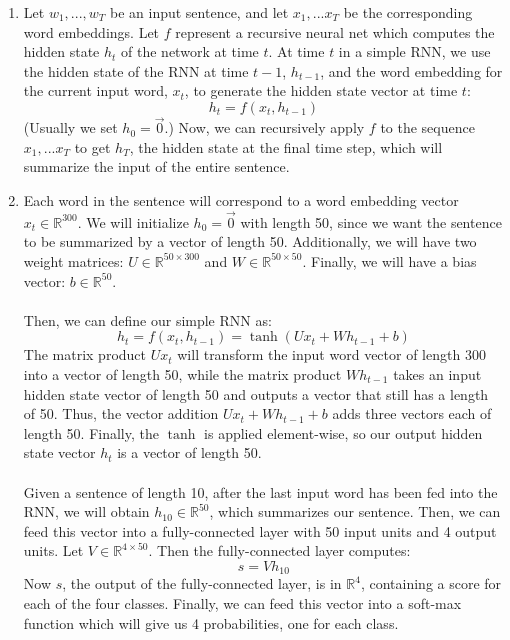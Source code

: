 \documentclass[a4paper]{article}
\begin{document}
\begin{enumerate}

\item{ Let $w_1,...,w_T$ be an input sentence, and let $x_1,...x_T$ be the corresponding word embeddings. Let $f$ represent a recursive neural net which computes the hidden state $h_t$ of the network at time $t$. At time $t$ in a simple RNN, we use the hidden state of the RNN at time $t-1$, $h_{t-1}$, and the word embedding for the current input word, $x_t$, to generate the hidden state vector at time $t$: 
$$h_t = f(x_t, h_{t-1}) $$ 
(Usually we set $h_0 = \vec{0}$.) Now, we can recursively apply $f$ to the sequence $x_1,...x_T$ to get $h_T$, the hidden state at the final time step, which will summarize the input of the entire sentence.}

\item{ Each word in the sentence will correspond to a word embedding vector $x_t \in \mathbb{R}^{300}$. We will initialize $h_0 = \vec{0}$ with length 50, since we want the sentence to be summarized by a vector of length 50. Additionally, we will have two weight matrices: $U \in \mathbb{R}^{50 \times 300}$ and $W \in \mathbb{R}^{50 \times 50}$. Finally, we will have a bias vector: $b \in \mathbb{R}^{50}$.
\\\\
Then, we can define our simple RNN as:
$$
h_t = f(x_t,h_{t-1}) = \tanh (Ux_t + Wh_{t-1} + b)
$$
The matrix product $Ux_t$ will transform the input word vector of length 300 into a vector of length 50, while the matrix product $Wh_{t-1}$ takes an input hidden state vector of length 50 and outputs a vector that still has a length of 50. Thus, the vector addition $Ux_t + Wh_{t-1} + b$ adds three vectors each of length 50. Finally, the $\tanh$ is applied element-wise, so our output hidden state vector $h_t$ is a vector of length 50.
\\\\
Given a sentence of length 10, after the last input word has been fed into the RNN, we will obtain $h_{10} \in \mathbb{R}^{50}$, which summarizes our sentence. Then, we can feed this vector into a fully-connected layer with 50 input units and 4 output units. Let $V \in \mathbb{R}^{4 \times 50}.$ Then the fully-connected layer computes:
$$s = V h_{10} $$
Now $s$, the output of the fully-connected layer, is in $\mathbb{R}^4$, containing a score for each of the four classes. Finally, we can feed this vector into a soft-max function which will give us 4 probabilities, one for each class.  
}

\end{enumerate}
\end{document}
